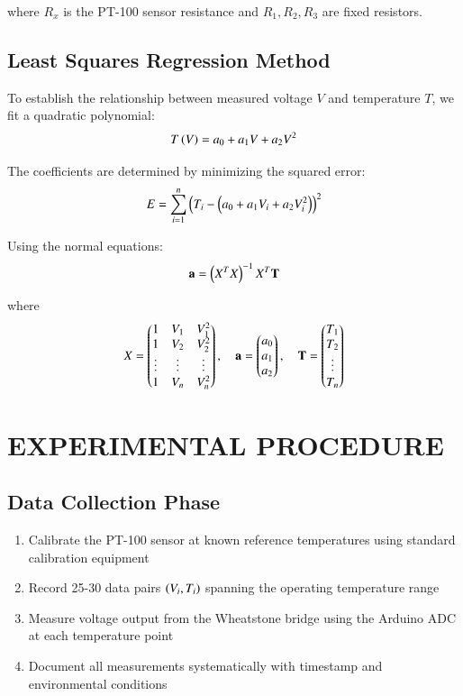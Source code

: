 \documentclass[journal]{IEEEtran}
\begin{document}
where \(R_x\) is the PT-100 sensor resistance and \(R_1, R_2, R_3\) are fixed resistors.

\subsection{\textbf{Least Squares Regression Method}}

To establish the relationship between measured voltage \(V\) and temperature \(T\), we fit a quadratic polynomial:
\begin{align}
T\left(V\right) = a_0 + a_1 V + a_2 V^2
\end{align}

The coefficients are determined by minimizing the squared error:
\begin{align}
E = \sum_{i=1}^{n}\left(T_i - \left(a_0 + a_1 V_i + a_2 V_i^2\right)\right)^2
\end{align}

Using the normal equations:
\begin{align}
\mathbf{a} = \left(X^T X\right)^{-1} X^T \mathbf{T}
\end{align}

where
\begin{align}
X = \begin{pmatrix}1 & V_1 & V_1^2 \\ 1 & V_2 & V_2^2 \\ \vdots & \vdots & \vdots \\ 1 & V_n & V_n^2\end{pmatrix}, \quad
\mathbf{a} = \begin{pmatrix}a_0 \\ a_1 \\ a_2\end{pmatrix}, \quad
\mathbf{T} = \begin{pmatrix}T_1 \\ T_2 \\ \vdots \\ T_n\end{pmatrix}
\end{align}

\section{\textbf{EXPERIMENTAL PROCEDURE}}

\subsection{\textbf{Data Collection Phase}}

\begin{enumerate}
\item Calibrate the PT-100 sensor at known reference temperatures using standard calibration equipment
\item Record 25-30 data pairs \(\left(V_i, T_i\right)\) spanning the operating temperature range
\item Measure voltage output from the Wheatstone bridge using the Arduino ADC at each temperature point
\item Document all measurements systematically with timestamp and environmental conditions
\end{enumerate}
\end{document}
